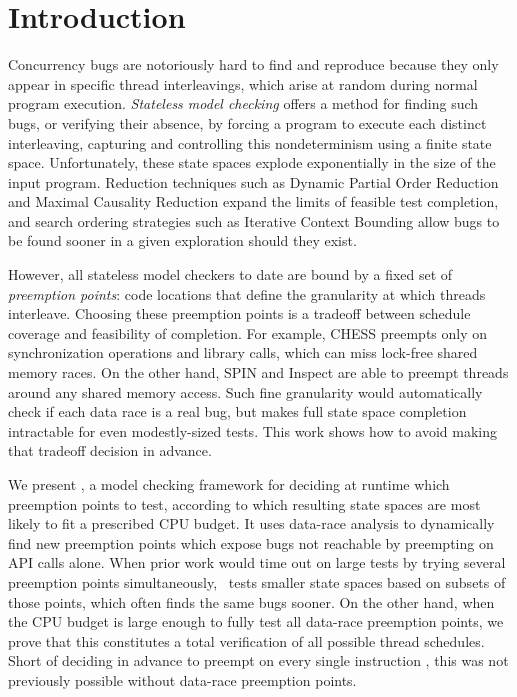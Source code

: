 \section{Introduction}

Concurrency bugs are notoriously hard to find and reproduce because they only appear in specific thread interleavings, which arise at random during normal program execution.
{\em Stateless model checking} \cite{verisoft} offers a method for finding such bugs,
or verifying their absence,
by forcing a program to execute each distinct interleaving,
capturing and controlling this nondeterminism using a finite state space.
Unfortunately, these state spaces explode exponentially in the size of the input program.
Reduction techniques such as Dynamic Partial Order Reduction \cite{dpor} and Maximal Causality Reduction \cite{mcr} expand the limits of feasible test completion,
and search ordering strategies such as Iterative Context Bounding \cite{chess-icb} allow bugs to be found sooner in a given exploration should they exist.

However, all stateless model checkers to date are bound by a fixed set of {\em preemption points}: code locations that define the granularity at which threads interleave.
Choosing these preemption points is a tradeoff between schedule coverage and feasibility of completion.
For example, \textsc{CHESS} \cite{chess} preempts only on synchronization operations and library calls, which can miss lock-free shared memory races.
%
On the other hand, SPIN \cite{spin} and Inspect \cite{inspect}
are able to preempt threads around any shared memory access. Such fine granularity would automatically check if each data race is a real bug, but makes full state space completion intractable for even modestly-sized tests.
%
This work shows how to avoid making that tradeoff decision in advance.

We present \quicksand,
a model checking framework for deciding at runtime which preemption points to test,
according to which resulting state spaces are most likely to fit a prescribed CPU budget.
It uses data-race analysis to dynamically find new preemption points which expose bugs not reachable by preempting on API calls alone.
When prior work would time out on large tests by trying several preemption points simultaneously,
\quicksand~tests smaller state spaces based on subsets of those points, which often finds the same bugs sooner.
On the other hand, when the CPU budget is large enough to fully test all data-race preemption points,
we prove that this constitutes a total verification of all possible thread schedules.
Short of deciding in advance to preempt on every single instruction \cite{spin}, this was not previously possible without data-race preemption points.

